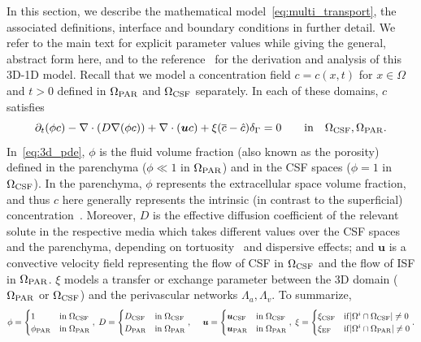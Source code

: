 In this section, we describe the mathematical
model~\eqref{eq:multi_transport}, the associated definitions,
interface and boundary conditions in further detail. We refer to the
main text for explicit parameter values while giving the general,
abstract form here, and to the reference~\cite{masri2024modelling} for
the derivation and analysis of this 3D-1D model. Recall that we model
a concentration field $c = c(x, t)$ for $x \in \Omega$ and $t > 0$
defined in $\Omega_{\rm PAR}$ and $\Omega_{\rm CSF}$ separately. In
each of these domains, $c$ satisfies
\begin{equation}
  \partial_t (\phi c) - \nabla \cdot (D \nabla (\phi c) ) + \nabla \cdot (\bm u c ) + \xi (\overline{c} - \hat c ) \delta_\Gamma
   = 0
  \quad \quad \mathrm{in} \quad \Omega_{\rm CSF}, \Omega_{\rm{PAR}}.
  \label{eq:3d_pde}
\end{equation}
In~\eqref{eq:3d_pde}, $\phi$ is the fluid volume fraction (also known as the porosity) defined in the parenchyma ($\phi \ll 1$ in $\Omega_{\rm PAR}$) and in the CSF spaces ($\phi = 1$ in $\Omega_{\rm CSF}$). In the parenchyma, $\phi$ represents the extracellular space volume fraction, and thus $c$ here generally represents the intrinsic (in contrast to the superficial) concentration~\cite{sykova2008diffusion}. Moreover, $D$ is the effective diffusion coefficient of the relevant solute in the respective media which takes different values over the CSF spaces and the parenchyma, depending on tortuosity~\cite{sykova2008diffusion} and dispersive effects; and $\bm u$ is a convective velocity field representing the flow of CSF in $\Omega_{\rm CSF}$ and the flow of ISF in $\Omega_{\rm PAR}$. $\xi$ models a transfer or exchange parameter between the 3D domain ($\Omega_{\rm PAR}$ or $\Omega_{\rm CSF}$) and the perivascular networks $\Lambda_a, \Lambda_v$. To summarize,
\begin{equation*}
\phi =  \begin{cases}
  1  & \mathrm{in} \;  \Omega_{\rm{CSF}} \\ 
  \phi_{\rm{PAR}} & \mathrm{in} \; \Omega_{\rm{PAR}} 
  \end{cases}, \; 
D = \begin{cases}
  D_{\rm{CSF}} & \mathrm{in} \;  \Omega_{\rm{CSF}} \\ 
  D_{\rm{PAR}} & \mathrm{in} \; \Omega_{\rm{PAR}} \end{cases}, \; 
  \quad \bm u  = \begin{cases}
  \bm{u}_{\rm{CSF}} & \mathrm{in} \; \Omega_{\rm{CSF}} \\ 
  \bm{u}_{\rm{PAR}} & \mathrm{in} \; \Omega_{\rm{PAR}} 
\end{cases}, \; 
\xi = \begin{cases}
  \xi_{\rm{CSF}} & \mathrm{if} |\Omega^i \cap \Omega_{\rm{CSF}}| \neq 0 \\
  \xi_{\rm{EF}} & \mathrm{if} |\Omega^i \cap \Omega_{\rm{PAR}}| \neq 0  
\end{cases} . 
\end{equation*}
